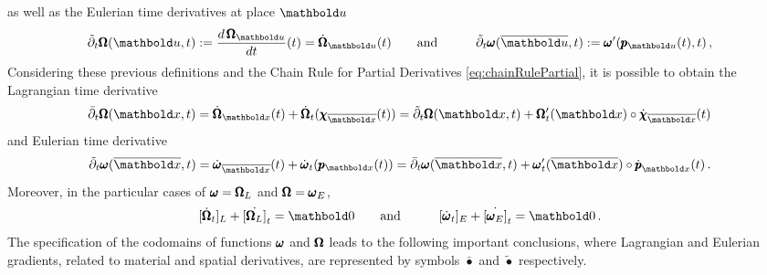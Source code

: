 as well as the Eulerian time derivatives at place ${\vto{u}}$
\begin{alignat}{3}\label{eq:EulDesc} 
\tilde{\partial}_t\tnr{\Omega}({\vto{u}},t):=\dfrac{d\,\tnr{\Omega}_{{\vto{u}}}}{dt}(t)={\dot{\tnr{\Omega}}}_{{\vto{u}}}(t)&\qquad \text{and}\qquad & \tilde{\partial}_t\tnr{\omega}(\overline{\vto{u}},t):=\tnr{\omega}'(\fua{\tnr{p}_{\vto{u}}}{t},t)\,,
\end{alignat}
Considering these previous definitions and the Chain Rule for Partial Derivatives \eqref{eq:chainRulePartial}, it is possible to obtain the Lagrangian time derivative 
\begin{equation}\label{eq:LagrTimeDerivative}
\bar{\partial}_t\tnr{\Omega}({\vto{x}},t)=\dot{\tnr{\Omega}}_{\vto{x}}(t)+\dot{\tnr{\Omega}}_{t}(\tnr{\chi}_{\overline{\vto{x}}}(t))=\tilde{\partial}_t\tnr{\Omega}({\vto{x}},t)+\tnr{\Omega}_t'(\vto{x})\circ\dot{\tnr{\chi}}_{\overline{\vto{x}}}(t)
\end{equation}
and Eulerian time derivative 
\begin{equation}\label{eq:EulerTimeDerivative}
\tilde{\partial}_t\tnr{\omega}(\overline{\vto{x}},t)=\dot{\tnr{\omega}}_{\overline{\vto{x}}}(t)+\dot{\tnr{\omega}}_{t}(\tnr{p}_{{\vto{x}}}(t))=
\bar{\partial}_t\tnr{\omega}(\overline{\vto{x}},t)+\tnr{\omega}_t'(\overline{\vto{x}})\circ\dot{\tnr{p}}_{{\vto{x}}}(t)\,.
\end{equation}
Moreover, in the particular cases of $\pmb{\omega}=\pmb{\Omega}_L$ and $\pmb{\Omega}=\pmb{\omega}_E$,
\begin{alignat}{3}\label{eq:zerosDescript} 
[\dot{\tnr{\Omega}}_{t}]_L+\dot{[\tnr{\Omega}_L]}_{t}=\vto{0}&\qquad \text{and}\qquad & [\dot{\tnr{\omega}}_{t}]_E+\dot{[\tnr{\omega}_E]}_{t}=\vto{0}\,.
\end{alignat}
The specification of the codomains of functions $\pmb{\omega}$ and $\pmb{\Omega}$ leads to the following important conclusions, where Lagrangian and Eulerian gradients, related to material and spatial derivatives, are represented by symbols $\bar{\bullet}$ and $\tilde{\bullet}$ respectively.
